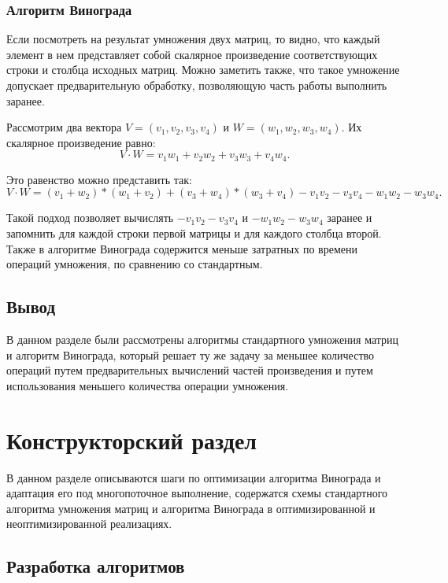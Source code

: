 \documentclass[a4paper,14pt]{article}
\begin{document}
		    
	  	\subsubsection{Алгоритм Винограда}
		Если посмотреть на результат умножения двух матриц, то видно,
что каждый элемент в нем представляет собой скалярное произведение
соответствующих строки и столбца исходных матриц. Можно заметить
также, что такое умножение допускает предварительную обработку,
позволяющую часть работы выполнить заранее.
	
	Рассмотрим два вектора $V = (v_1, v_2, v_3, v_4)$ и $W = (w_1, w_2, w_3, w_4)$. Их скалярное произведение равно:
	\[
	 V \cdot W = v_1w_1 + v_2w_2 + v_3w_3 + v_4w_4.
	\]
	
	Это равенство можно представить так:
	\[
	 V \cdot W = (v_1 + w_2) * (w_1 + v_2) + (v_3 + w_4)*(w_3 + v_4) - v_1v_2 - v_3v_4 - w_1w_2 - w_3w_4.
	 \]	 
	 
	Такой подход позволяет вычислять $ - v_1v_2 - v_3v_4$ и $ - w_1w_2 - w_3w_4$ заранее и запомнить для каждой строки первой матрицы и для каждого столбца второй. Также в алгоритме Винограда содержится меньше затратных по времени операций умножения, по сравнению со стандартным\cite{ma}.
	

	    
		\subsection*{Вывод}
		В данном разделе были рассмотрены алгоритмы стандартного умножения матриц и алгоритм Винограда, который решает ту же задачу за меньшее количество операций путем предварительных вычислений частей произведения и путем использования меньшего количества операции умножения. 


\pagebreak


\section{Конструкторский раздел}
	В данном разделе описываются шаги по оптимизации алгоритма Винограда и адаптация его под многопоточное выполнение, содержатся схемы стандартного алгоритма умножения матриц и алгоритма Винограда в оптимизированной и неоптимизированной реализациях.
	
        
    \subsection{Разработка алгоритмов}
\end{document}
